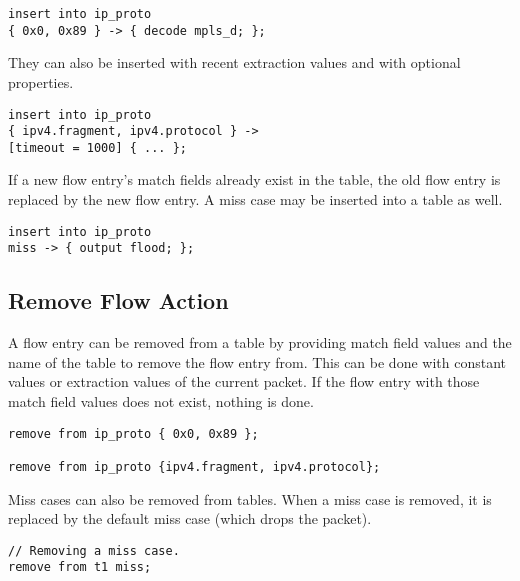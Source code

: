 \begin{codepage}
\begin{lstlisting}
insert into ip_proto
{ 0x0, 0x89 } -> { decode mpls_d; };
\end{lstlisting}
\end{codepage}

They can also be inserted with recent extraction values and with
optional properties.

\begin{codepage}
\begin{lstlisting}
insert into ip_proto
{ ipv4.fragment, ipv4.protocol } ->
[timeout = 1000] { ... };
\end{lstlisting}
\end{codepage}

If a new flow entry's match fields already exist in the table, the old flow
entry is replaced by the new flow entry. A miss case may be inserted into a
table as well.

\begin{codepage}
\begin{lstlisting}
insert into ip_proto
miss -> { output flood; };
\end{lstlisting}
\end{codepage}

\subsection{Remove Flow Action} \label{tut:remove_flow_action}

A flow entry can be removed from a table by providing match field values and the
name of the table to remove the flow entry from. This can be done with constant
values or extraction values of the current packet. If the flow entry with
those match field values does not exist, nothing is done.

\begin{codepage}
\begin{lstlisting}
remove from ip_proto { 0x0, 0x89 };

remove from ip_proto {ipv4.fragment, ipv4.protocol};
\end{lstlisting}
\end{codepage}

Miss cases can also be removed from tables. When a miss case is removed, it is
replaced by the default miss case (which drops the packet).

\begin{codepage}
\begin{lstlisting}
// Removing a miss case.
remove from t1 miss;
\end{lstlisting}
\end{codepage}

